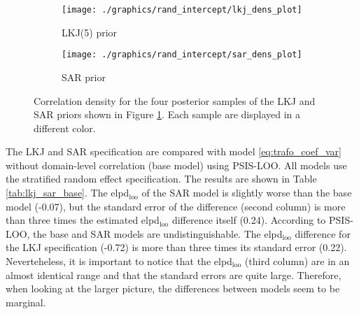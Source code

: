 \begin{figure}
    \begin{subfigure}{0.49\linewidth}
        \texttt{[image: ./graphics/rand\_intercept/lkj\_dens\_plot]}
        \caption{LKJ(5) prior}
    \end{subfigure}
    \begin{subfigure}{0.49\linewidth}
        \texttt{[image: ./graphics/rand\_intercept/sar\_dens\_plot]}
        \caption{SAR prior}
    \end{subfigure}
    \caption[Correlation density for the LKJ and SAR priors]{Correlation density for the four posterior samples of the LKJ and SAR priors shown in Figure \ref{fig:corr_density}. Each sample are displayed in a different color.}
    \label{fig:corr_density}
\end{figure}


The LKJ and SAR specification are compared with model \ref{eq:trafo_coef_var} without domain-level correlation (base model) using PSIS-LOO.
All models use the stratified random effect specification.
The results are shown in Table \ref{tab:lkj_sar_base}.
The elpd$_{\text{loo}}$ of the SAR model is slightly worse than the base model (-0.07), but the standard error of the difference (second column) is more than three times the estimated elpd$_{\text{loo}}$ difference itself (0.24).
According to PSIS-LOO, the base and SAR models are undistinguishable.
The elpd$_{\text{loo}}$ difference for the LKJ specification (-0.72) is more than three times its standard error (0.22).
Neverteheless, it is important to notice that the elpd$_{\text{loo}}$ (third column) are in an almost identical range and that the standard errors are quite large.
Therefore, when looking at the larger picture, the differences between models seem to be marginal.



